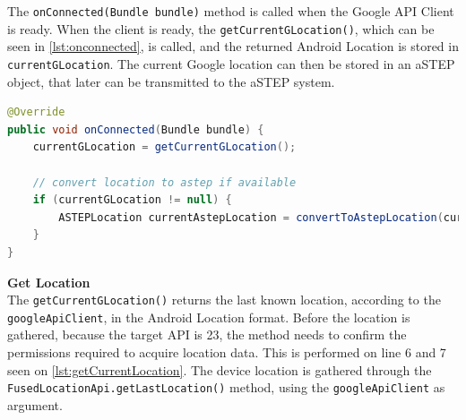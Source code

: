The \texttt{onConnected(Bundle bundle)} method is called when the Google API Client is ready.
When the client is ready, the \texttt{getCurrentGLocation()}, which can be seen in \ref{lst:onconnected}, is called, and the returned Android Location is stored in \texttt{currentGLocation}. 
The current Google location can then be stored in an aSTEP object, that later can be transmitted to the aSTEP system.

\begin{lstlisting}[caption={onConnected()},label={lst:onconnected},language=Java]
@Override
public void onConnected(Bundle bundle) {
	currentGLocation = getCurrentGLocation();

	// convert location to astep if available
	if (currentGLocation != null) {
		ASTEPLocation currentAstepLocation = convertToAstepLocation(currentGLocation);
	}
}
\end{lstlisting}


\textbf{Get Location}\\
The \texttt{getCurrentGLocation()} returns the last known location, according to the \texttt{googleApiClient}, in the Android Location format.
Before the location is gathered, because the target API is 23, the method needs to confirm the permissions required to acquire location data.
This is performed on line 6 and 7 seen on \ref{lst:getCurrentLocation}.
The device location is gathered through the \texttt{FusedLocationApi.getLastLocation()} method, using the \texttt{googleApiClient} as argument.

